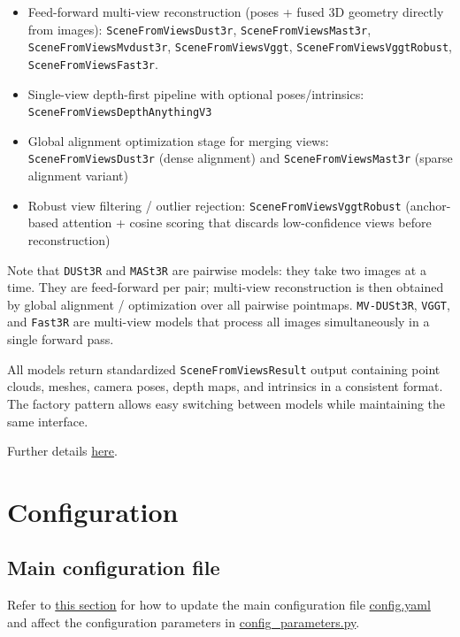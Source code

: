 \documentclass{article}
\providecommand{\tightlist}{%
  \setlength{\itemsep}{0pt}\setlength{\parskip}{0pt}}
\begin{document}
\begin{itemize}
\tightlist
\item
  Feed-forward multi-view reconstruction (poses + fused 3D geometry
  directly from images): \texttt{SceneFromViewsDust3r},
  \texttt{SceneFromViewsMast3r}, \texttt{SceneFromViewsMvdust3r},
  \texttt{SceneFromViewsVggt}, \texttt{SceneFromViewsVggtRobust}, \texttt{SceneFromViewsFast3r}.
\item
  Single-view depth-first pipeline with optional poses/intrinsics:
  \texttt{SceneFromViewsDepthAnythingV3}
\item
  Global alignment optimization stage for merging views:
  \texttt{SceneFromViewsDust3r} (dense alignment) and
  \texttt{SceneFromViewsMast3r} (sparse alignment variant)
\item
  Robust view filtering / outlier rejection:
  \texttt{SceneFromViewsVggtRobust} (anchor-based attention + cosine
  scoring that discards low-confidence views before reconstruction)
\end{itemize}

Note that \texttt{DUSt3R} and \texttt{MASt3R} are pairwise models: they
take two images at a time. They are feed-forward per pair; multi-view
reconstruction is then obtained by global alignment / optimization over
all pairwise pointmaps. \texttt{MV-DUSt3R}, \texttt{VGGT}, and
\texttt{Fast3R} are multi-view models that process all images
simultaneously in a single forward pass.

All models return standardized \texttt{SceneFromViewsResult} output
containing point clouds, meshes, camera poses, depth maps, and
intrinsics in a consistent format. The factory pattern allows easy
switching between models while maintaining the same interface.

Further details \href{https://github.com/luigifreda/pyslam/blob/master/pyslam/scene_from_views/README.md}{here}.


\hypertarget{configuration}{%
\section{Configuration}\label{configuration}}

\hypertarget{main-configuration-file}{%
\subsection{Main configuration file}\label{main-configuration-file}}

Refer to
\protect\hyperlink{selecting-a-dataset-and-different-configuration-parameters}{this
section} for how to update the main configuration file
\href{https://github.com/luigifreda/pyslam/blob/master/config.yaml}{config.yaml} and affect the configuration
parameters in \href{https://github.com/luigifreda/pyslam/blob/master/pyslam/config_parameters.py}{config\_parameters.py}.
\end{document}
